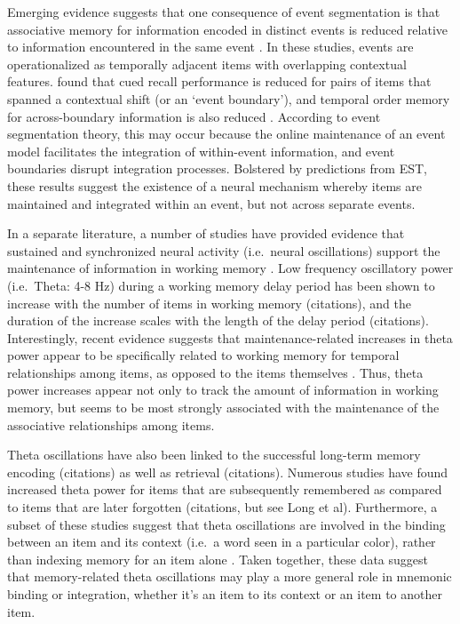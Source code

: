 Emerging evidence suggests that one consequence of event segmentation is
that associative memory for information encoded in distinct events is
reduced relative to information encountered in the same event
\autocites{ezzyat_what_2011}{dubrow_influence_2013}. In these studies,
events are operationalized as temporally adjacent items with overlapping
contextual features. \textcite{ezzyat_what_2011} found that cued recall
performance is reduced for pairs of items that spanned a contextual
shift (or an `event boundary'), and temporal order memory for
across-boundary information is also reduced
\autocite{dubrow_influence_2013}. According to event segmentation
theory, this may occur because the online maintenance of an event model
facilitates the integration of within-event information, and event
boundaries disrupt integration processes. Bolstered by predictions from
EST, these results suggest the existence of a neural mechanism whereby
items are maintained and integrated within an event, but not across
separate events.

In a separate literature, a number of studies have provided evidence
that sustained and synchronized neural activity (i.e.~neural
oscillations) support the maintenance of information in working memory
\autocites{jensen_frontal_2002}{raghavachari_gating_2001}{hsieh_neural_2011}.
Low frequency oscillatory power (i.e.~Theta: 4-8 Hz) during a working
memory delay period has been shown to increase with the number of items
in working memory (citations), and the duration of the increase scales
with the length of the delay period (citations). Interestingly, recent
evidence suggests that maintenance-related increases in theta power
appear to be specifically related to working memory for temporal
relationships among items, as opposed to the items themselves
\autocite{hsieh_neural_2011}. Thus, theta power increases appear not
only to track the amount of information in working memory, but seems to
be most strongly associated with the maintenance of the associative
relationships among items.

Theta oscillations have also been linked to the successful long-term
memory encoding (citations) as well as retrieval (citations). Numerous
studies have found increased theta power for items that are subsequently
remembered as compared to items that are later forgotten (citations, but
see Long et al). Furthermore, a subset of these studies suggest that
theta oscillations are involved in the binding between an item and its
context (i.e.~a word seen in a particular color), rather than indexing
memory for an item alone
\autocites{summerfield_coherent_2005}{staudigl_theta_2013}. Taken
together, these data suggest that memory-related theta oscillations may
play a more general role in mnemonic binding or integration, whether
it's an item to its context or an item to another item.

